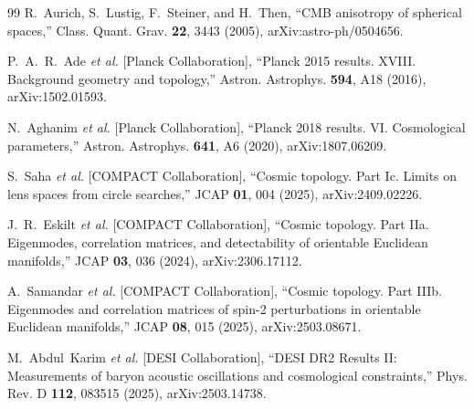 \documentclass[
  aps,
  prd,
  reprint,
  superscriptaddress,
  floatfix,
  nofootinbib,
  longbibliography
]{revtex4-2}
\theoremstyle{plain}
\theoremstyle{definition}
\theoremstyle{remark}
\begin{document}
\begin{sloppypar}
\begin{thebibliography}{99}
R.~Aurich, S.~Lustig, F.~Steiner, and H.~Then,
``CMB anisotropy of spherical spaces,''
Class. Quant. Grav. \textbf{22}, 3443 (2005),
arXiv:astro-ph/0504656.

P.~A.~R.~Ade \textit{et al.} [Planck Collaboration],
``Planck 2015 results. XVIII. Background geometry and topology,''
Astron. Astrophys. \textbf{594}, A18 (2016),
arXiv:1502.01593.

N.~Aghanim \textit{et al.} [Planck Collaboration],
``Planck 2018 results. VI. Cosmological parameters,''
Astron. Astrophys. \textbf{641}, A6 (2020),
arXiv:1807.06209.

S.~Saha \textit{et al.} [COMPACT Collaboration],
``Cosmic topology. Part Ic. Limits on lens spaces from circle searches,''
JCAP \textbf{01}, 004 (2025),
arXiv:2409.02226.

J.~R.~Eskilt \textit{et al.} [COMPACT Collaboration],
``Cosmic topology. Part IIa. Eigenmodes, correlation matrices, and detectability of orientable Euclidean manifolds,''
JCAP \textbf{03}, 036 (2024),
arXiv:2306.17112.

A.~Samandar \textit{et al.} [COMPACT Collaboration],
``Cosmic topology. Part IIIb. Eigenmodes and correlation matrices of spin-2 perturbations in orientable Euclidean manifolds,''
JCAP \textbf{08}, 015 (2025),
arXiv:2503.08671.

M.~Abdul~Karim \textit{et al.} [DESI Collaboration],
``DESI DR2 Results II: Measurements of baryon acoustic oscillations and cosmological constraints,''
Phys. Rev. D \textbf{112}, 083515 (2025),
arXiv:2503.14738.

\end{thebibliography}
\end{sloppypar}
\end{document}
